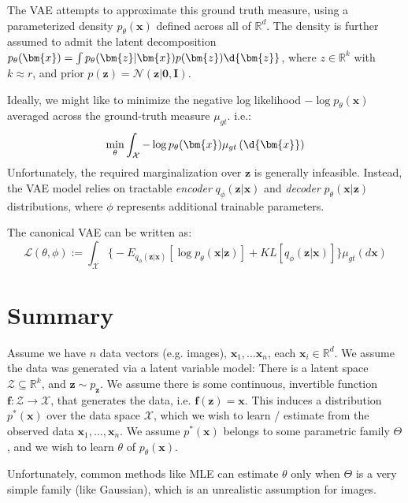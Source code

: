 \documentclass{article}
\begin{document}
The VAE attempts to approximate this ground truth measure, using a parameterized density $p_{\theta}(\bm{x})$ defined across all of $\mathbb{R}^{d}$.
The density is further assumed to admit the latent decomposition $p_{\theta}(\bm{x}) = \int p_{\theta}(\bm{z} | \bm{x}) p(\bm{z}) \d{\bm{z}}$, where $z \in \mathbb{R}^{k}$ with $k \approx r$, and prior $p(\bm{z}) = \mathcal{N}(\bm{z} | \bm{0}, \bm{I})$. 

Ideally, we might like to minimize the negative log likelihood $- \log p_{\theta}(\bm{x})$ averaged across the ground-truth measure $\mu_{gt}$. i.e.:
\[
  \min_{\theta} \int_{\mathcal{X}} - \log p_{\theta}(\bm{x}) \mu_{gt} \left( \d{\bm{x}} \right)
\]
Unfortunately, the required marginalization over $\bm{z}$ is generally infeasible. Instead, the VAE model relies on tractable \textit{encoder} $q_{\phi}(\bm{z} | \bm{x})$ and \textit{decoder} $p_{\theta}(\bm{x} | \bm{z})$ distributions, where $\phi$ represents additional trainable parameters. 

The canonical VAE can be written as:
\[
  \mathcal{L}(\theta, \phi) := \int_{\mathcal{X}} \Big\{ - E_{q_{\phi}(\bm{z} | \bm{x})} \left[ \log p_{\theta}(\bm{x} | \bm{z}) \right] + KL[q_{\phi}(\bm{z} | \bm{x})] \Big\} \mu_{gt}(d \bm{x}) 
\] 

\section{Summary}
Assume we have $n$ data vectors (e.g. images),  $\bm{x}_1, \ldots  \bm{x}_n$, each $\bm{x}_i \in \mathbb{R}^{d}$. 
We assume the data was generated via a latent variable model: There is a latent space $\mathcal{Z} \subseteq \mathbb{R}^{k}$, and $\bm{z} \sim p_{\bm{z}}$. 
We assume there is some continuous, invertible function $\bm{f} : \mathcal{Z} \to \mathcal{X}$, that generates the data, i.e.  $\bm{f}(\bm{z}) = \bm{x}$. 
This induces a distribution $p ^{\ast}(\bm{x})$ over the data space $\mathcal{X}$, which we wish to learn / estimate from the observed data $\bm{x}_1, \ldots, \bm{x}_n$. 
We assume $p ^{\ast}(\bm{x})$ belongs to some parametric family $\Theta$, and we wish to learn $\theta$ of $p_{\theta}(\bm{x})$. 

Unfortunately, common methods like MLE can estimate $\theta$ only when $\Theta$ is a very simple family (like Gaussian), which is an unrealistic assumption for images. 
\end{document}
